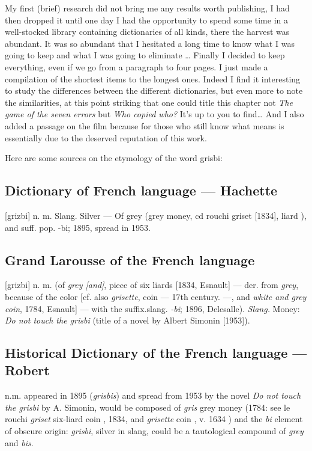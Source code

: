 My first (brief) research did not bring me any results worth publishing, I had then dropped it until one day I had the opportunity to spend some time in a well-stocked library containing dictionaries of all kinds, there the harvest was abundant. It was so abundant that I hesitated a long time to know what I was going to keep and what I was going to eliminate \ldots
Finally I decided to keep everything, even if we go from a paragraph to four pages. I just made a compilation of the shortest items to the longest ones.
Indeed I find it interesting to study the differences between the different
dictionaries, but even more to note the similarities, at this point
striking that one could title this chapter not \emph{The game of the seven
errors} but \emph{Who copied who?} It's up to you to find\dots
And I also added a passage on the film because for those who still know
what  means is essentially due to the deserved reputation of this work.

Here are some sources on the etymology  of the word grisbi:

\subsection*{Dictionary of French language --- Hachette}

[grizbi] n. m. Slang. Silver --- Of grey (grey money, cd rouchi griset [1834], \og liard \fg{}), and suff. pop. -bi; 1895, spread in 1953.

\subsection*{Grand Larousse of the French language}

[grizbi] n. m. (of \emph{grey [and]}, piece of six liards [1834, Esnault] --- der.
from \emph{grey}, because of the color [cf. also \emph{grisette}, \og coin \fg{} --- 17th century. ---, and \emph{white and grey coin}, 1784, Esnault] --- with the suffix.slang. \emph{-bi}; 1896, Delesalle).
\emph{Slang.} Money: \emph{Do not touch the grisbi} (title of a novel by Albert
Simonin [1953]).

\subsection*{Historical Dictionary of the French language --- Robert}

n.m. appeared in 1895 (\emph{grisbis}) and spread from 1953 by the novel
\emph{Do not touch the grisbi} by A. Simonin, would be composed of \emph{gris}
\og grey money \fg{} (1784: see le rouchi \emph{griset} \og six-liard coin \fg{}, 1834, and \emph{grisette} \og coin \fg{}, v. 1634 ) and the \emph{bi} element of obscure origin: \emph{grisbi}, \og silver \fg{} in slang, could be a tautological compound of \emph{grey} and \emph{bis}.


